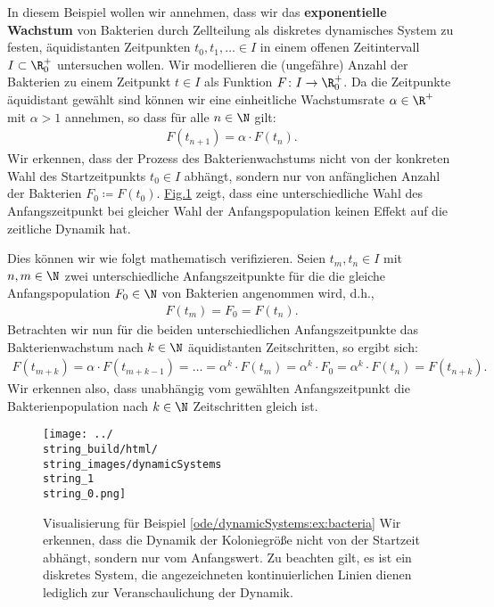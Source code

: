 \documentclass[letterpaper,10pt,english]{jupyterBook}
\begin{document}
\begin{example}{}{}



In diesem Beispiel wollen wir annehmen, dass wir das \textbf{exponentielle Wachstum} von Bakterien durch Zellteilung als diskretes dynamisches System zu festen, äquidistanten Zeitpunkten \(t_0, t_1, \ldots \in I\) in einem offenen Zeitintervall \(I\subset\R^+_0\) untersuchen wollen.
Wir modellieren die (ungefähre) Anzahl der Bakterien zu einem Zeitpunkt \(t \in I\) als Funktion \(F \colon I \rightarrow \R_0^+\).
Da die Zeitpunkte äquidistant gewählt sind können wir eine einheitliche Wachstumsrate \(\alpha \in \R^+\) mit \(\alpha > 1\) annehmen, so dass für alle \(n \in \N\) gilt:
\begin{align*}
F(t_{n+1}) = \alpha \cdot F(t_n).
\end{align*}
Wir erkennen, dass der Prozess des Bakterienwachstums nicht von der konkreten Wahl des Startzeitpunkts \(t_0 \in I\) abhängt, sondern nur von anfänglichen Anzahl der Bakterien \(F_0 \coloneqq F(t_0)\). \hyperref[\detokenize{ode/dynamicSystems:fig-bacteria}]{Fig.\@ \ref{\detokenize{ode/dynamicSystems:fig-bacteria}}} zeigt, dass eine unterschiedliche Wahl des Anfangszeitpunkt bei gleicher Wahl der Anfangspopulation keinen Effekt auf die zeitliche Dynamik hat.

Dies können wir wie folgt mathematisch verifizieren. Seien \(t_m, t_n \in I\) mit \(n,m \in \N\) zwei unterschiedliche Anfangszeitpunkte für die die gleiche Anfangspopulation \(F_0 \in \N\) von Bakterien angenommen wird, d.h.,
\begin{align*}
F(t_m) = F_0 = F(t_n).
\end{align*}
Betrachten wir nun für die beiden unterschiedlichen Anfangszeitpunkte das Bakterienwachstum nach \(k \in \N\) äquidistanten Zeitschritten, so ergibt sich:
\begin{align*}
F(t_{m+k}) = \alpha \cdot F(t_{m+k-1}) = \ldots = \alpha^k \cdot F(t_{m}) = \alpha^k \cdot F_0 = \alpha^k \cdot F(t_n) = F(t_{n+k}).
\end{align*}
Wir erkennen also, dass unabhängig vom gewählten Anfangszeitpunkt die Bakterienpopulation nach \(k \in \N\) Zeitschritten gleich ist.
\end{example}

\begin{figure}[htbp]
\centering


\noindent\texttt{[image: ../\\string\_build/html/\\string\_images/dynamicSystems\\string\_1\\string\_0.png]}
\caption{Visualisierung für Beispiel \cref{ode/dynamicSystems:ex:bacteria}  Wir erkennen, dass die Dynamik der Koloniegröße nicht von der Startzeit abhängt, sondern nur vom Anfangswert. Zu beachten gilt, es ist ein diskretes System, die angezeichneten kontinuierlichen Linien dienen lediglich zur Veranschaulichung der Dynamik.}\label{\detokenize{ode/dynamicSystems:fig-bacteria}}\end{figure}
\end{document}
